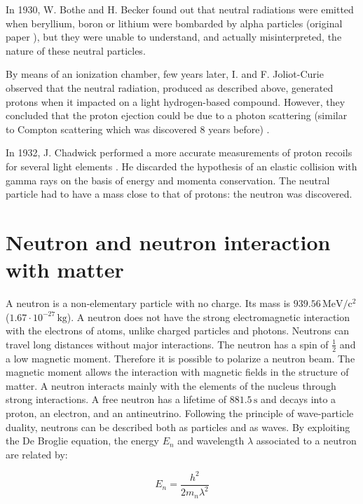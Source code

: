 \begin{refsection}
  In 1930, W. Bothe and H. Becker found out that neutral radiations were emitted when beryllium, boron or lithium were bombarded by alpha particles (original paper \cite{Bothe1930}), but they were unable to understand, and actually misinterpreted, the nature of these neutral particles.

  By means of an ionization chamber, few years later, I. and F. Joliot-Curie observed that the neutral radiation, produced as described above, generated protons when it impacted on a light hydrogen-based compound. However, they concluded that the proton ejection could be due to a photon scattering (similar to Compton scattering which was discovered 8 years before) \cite{curie:jpa-00233129}.

  In 1932, J. Chadwick performed a more accurate measurements of proton recoils for several light elements \cite{Chadwick1932}. He discarded the hypothesis of an elastic collision with gamma rays on the basis of energy and momenta conservation. The neutral particle had to have a mass close to that of protons: the neutron was discovered.

  \section{Neutron and neutron interaction with matter}
  \label{ch1:sec:Neutron}
  A neutron is a non-elementary particle with no charge. Its mass is $939.56\,\mathrm{MeV/c^{2}}$ ($1.67 \cdot 10^{-27}\,\mathrm{kg}$). A neutron does not have the strong electromagnetic interaction with the electrons of atoms, unlike charged particles and photons. Neutrons can travel long distances without major interactions. The neutron has a spin of $\frac{1}{2}$ and a low magnetic moment. Therefore it is possible to polarize a neutron beam. The magnetic moment allows the interaction with magnetic fields in the structure of matter. A neutron interacts mainly with the elements of the nucleus through strong interactions. A free neutron has a lifetime of $881.5\,\mathrm{s}$ and decays into a proton, an electron, and an antineutrino.
  Following the principle of wave-particle duality, neutrons can be described both as particles and as waves. By exploiting the De Broglie equation, the energy $E_{n}$ and wavelength $\lambda$ associated to a neutron are related by:

  \begin{equation*}
    E_{n} = \frac{h^{2}}{2m_{n}\lambda^{2}}
  \end{equation*}


\end{refsection}
